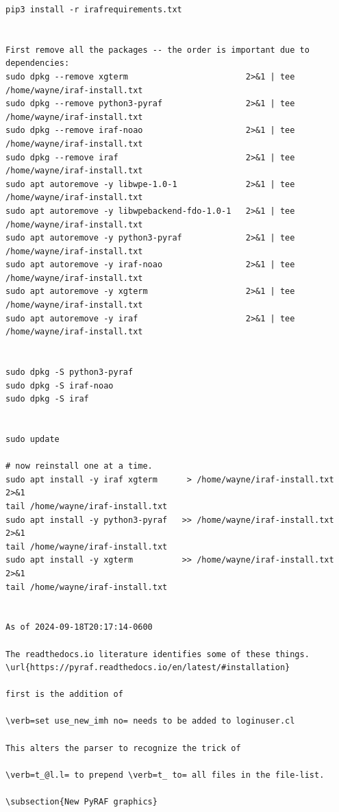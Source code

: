 \begingroup \fontsize{10pt}{10pt}
\selectfont
\begin{verbatim} 
pip3 install -r irafrequirements.txt


First remove all the packages -- the order is important due to dependencies:
sudo dpkg --remove xgterm                        2>&1 | tee  /home/wayne/iraf-install.txt 
sudo dpkg --remove python3-pyraf                 2>&1 | tee  /home/wayne/iraf-install.txt 
sudo dpkg --remove iraf-noao                     2>&1 | tee  /home/wayne/iraf-install.txt 
sudo dpkg --remove iraf                          2>&1 | tee  /home/wayne/iraf-install.txt 
sudo apt autoremove -y libwpe-1.0-1              2>&1 | tee  /home/wayne/iraf-install.txt 
sudo apt autoremove -y libwpebackend-fdo-1.0-1   2>&1 | tee  /home/wayne/iraf-install.txt 
sudo apt autoremove -y python3-pyraf             2>&1 | tee  /home/wayne/iraf-install.txt 
sudo apt autoremove -y iraf-noao                 2>&1 | tee  /home/wayne/iraf-install.txt 
sudo apt autoremove -y xgterm                    2>&1 | tee  /home/wayne/iraf-install.txt 
sudo apt autoremove -y iraf                      2>&1 | tee  /home/wayne/iraf-install.txt 


sudo dpkg -S python3-pyraf  
sudo dpkg -S iraf-noao
sudo dpkg -S iraf


sudo update

# now reinstall one at a time.
sudo apt install -y iraf xgterm      > /home/wayne/iraf-install.txt 2>&1
tail /home/wayne/iraf-install.txt
sudo apt install -y python3-pyraf   >> /home/wayne/iraf-install.txt 2>&1
tail /home/wayne/iraf-install.txt
sudo apt install -y xgterm          >> /home/wayne/iraf-install.txt 2>&1
tail /home/wayne/iraf-install.txt


As of 2024-09-18T20:17:14-0600 

The readthedocs.io literature identifies some of these things.
\url{https://pyraf.readthedocs.io/en/latest/#installation}

first is the addition of 

\verb=set use_new_imh no= needs to be added to loginuser.cl

This alters the parser to recognize the trick of

\verb=t_@l.l= to prepend \verb=t_ to= all files in the file-list.

\subsection{New PyRAF graphics}



\end{verbatim}
